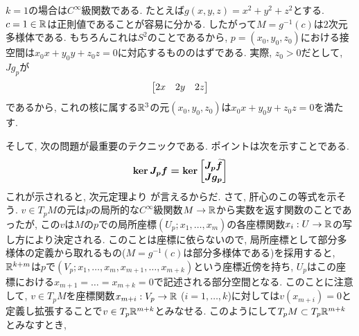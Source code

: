 \begin{eg}
$k=1$の場合は$C^{\infty}$級関数である. たとえば$g(x,y,z) = x^2 + y^2 + z^2$とする. $c=1\in \mathbb{R}$は正則値であることが容易に分かる. %
したがって$M=g^{-1}(c)$は$2$次元多様体である. もちろんこれは$S^2$のことであるから,  $p=(x_0,y_0,z_0)$における接空間は$x_0x + y_0y + z_0z = 0$に対応するもののはずである. 実際, $z_0 > 0$だとして,  $Jg_p$が
\[\begin{bmatrix} 2x & 2y & 2z \end{bmatrix}\]
であるから, これの核に属する$\mathbb{R}^3$の元$(x_0,y_0,z_0)$は$x_0x + y_0y + z_0z = 0$を満たす.

\end{eg}
そして, 次の問題が最重要のテクニックである.
\prf
ポイントは次を示すことである.
\[{\mbox{\boldmath $\ker{J_{p}f}= \ker{\begin{bmatrix}J_{p}\widetilde{f} \\ Jg_p\end{bmatrix}}$}}\]
これが示されると, 次元定理より
が言えるからだ. さて, 肝心のこの等式を示そう. $v\in T_{p}M$の元は$p$の局所的な$C^{\infty}$級関数$M\to \mathbb{R}$から実数を返す関数のことであったが, この$v$は$M$の$p$での局所座標$(U_p;x_1,\dots, x_m)$の各座標関数$x_i:U\to \mathbb{R}$の写し方により決定される. このことは座標に依らないので, 局所座標として部分多様体の定義から取れるもの($M=g^{-1}(c)$は部分多様体である)を採用すると, $\mathbb{R}^{k+m}$は$p$で$(V_{p}; x_1,\dots, x_m, x_{m+1},\dots, x_{m+k})$という座標近傍を持ち, $U_p$はこの座標における$x_{m+1} = \dots = x_{m+k} = 0$で記述される部分空間となる. このことに注意して, $v\in T_{p}M$を座標関数$x_{m+i}:V_{p}\to \mathbb{R}$ ($i=1,\dots, k$)に対しては$v(x_{m+i}) = 0$と定義し拡張することで$v\in T_{p}\mathbb{R}^{m+k}$とみなせる. このようにして$T_{p}M\subset T_{p}\mathbb{R}^{m+k}$とみなすとき,
